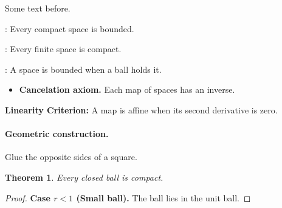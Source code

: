 \documentclass{article}
\newtheorem{theorem}{Theorem}
\begin{document}
Some text before.

: Every compact space is bounded.

: Every finite space is compact.

: A space is bounded when a ball holds it.

\begin{itemize}
  \item {\bf Cancelation axiom.} Each map of spaces has an inverse.
\end{itemize}

\textbf{Linearity Criterion:} A map is affine when its second derivative is zero.

\paragraph{\bf Geometric construction.}
Glue the opposite sides of a square.

\begin{theorem} Every closed ball is compact. \end{theorem}
\begin{proof}
\textbf{Case $r<1$ (Small ball).} The ball lies in the unit ball.
\end{proof}
\end{document}

